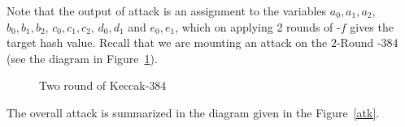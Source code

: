 Note that the output of attack is an assignment to the variables $a_0, a_1, a_2$, $b_0, b_1, b_2$, $c_0, c_1, c_2$, $d_0, d_1$ and $e_0, e_1$, which on applying 2 rounds of \KECCAK-$f$ gives the target hash value. Recall that we are mounting an attack on the $2$-Round \Keccak-$384$ (see the diagram in Figure~\ref{two_rnd}).
\begin{figure}
\begin{center}
\caption{Two round of Keccak-$384$\label{two_rnd}}
\end{center}
\end{figure}
%
%
The overall attack is summarized in the  diagram given in the Figure~\ref{atk}. 
%
